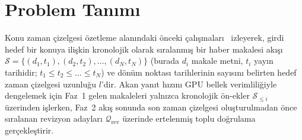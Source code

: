 ﻿\documentclass[journal]{IEEEtran}
\begin{document}
\begin{table}[t]
\centering
\caption{ReviTLS'in Temsilci TLS Paradigmalar{\i}yla Kar\c{s}{\i}la\c{s}t{\i}r{\i}lmas{\i}}
\label{tab:related_work}
\renewcommand{\arraystretch}{1.10}
\end{table}

\section{Problem Tan{\i}m{\i}}
\label{sec:problem}

Konu zaman \c{c}izelgesi \"{o}zetleme alan{\i}ndaki \"{o}nceki \c{c}al{\i}\c{s}malar{\i}~\cite{ghalandari2020examining, hu2024moments} izleyerek, girdi hedef bir konuya ili\c{s}kin kronolojik olarak s{\i}ralanm{\i}\c{s} bir haber makalesi ak{\i}\c{s}{\i} $\mathcal{S} = \{(d_1, t_1), (d_2, t_2), \dots, (d_N, t_N)\}$ (burada $d_i$ makale metni, $t_i$ yay{\i}n tarihidir; $t_1 \le t_2 \le \dots \le t_N$) ve d\"{o}n\"{u}m noktas{\i} tarihlerinin say{\i}s{\i}n{\i} belirten hedef zaman \c{c}izelgesi uzunlu\u{g}u $l$'dir. Akan yan{\i}t h{\i}z{\i}n{\i} GPU bellek verimlili\u{g}iyle dengelemek i\c{c}in Faz~1 gelen makaleleri yaln{\i}zca kronolojik \"{o}n-ekler $\mathcal{S}_{\le i}$ \"{u}zerinden i\c{s}lerken, Faz~2 ak{\i}\c{s} sonunda son zaman \c{c}izelgesi olu\c{s}turulmadan \"{o}nce s{\i}ralanan revizyon adaylar{\i} $\mathcal{Q}_{\text{rev}}$ \"{u}zerinde ertelenmi\c{s} toplu do\u{g}rulama ger\c{c}ekle\c{s}tirir.
\end{document}
